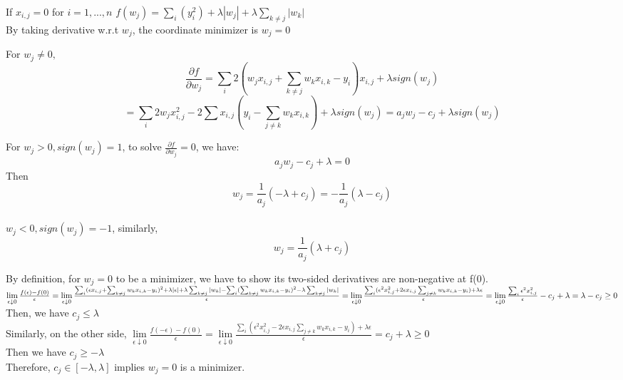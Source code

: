 \documentclass{article}
\newenvironment{problem}[2][$\bullet$]{\begin{trivlist}\large
		\item[\hskip \labelsep {\bfseries #1}\hskip \labelsep {\bfseries #2.}]}  {\end{trivlist}}
\newenvironment{sub}[2][$-$]{\begin{trivlist}
		\item[\hskip \labelsep {\bfseries #1}\hskip \labelsep {\bfseries #2.}]}  {\end{trivlist}}
\begin{document}
\begin{problem}{2.2 Derive the Coordinate Minimizer for Lasso}
\end{problem}

\begin{sub}{2.1.1}
\end{sub}
If $x_{i,j} = 0$ for $i = 1,...,n$  $f(w_j) = \sum_i (y_i^2) +\lambda |w_j| + \lambda \sum_{k \neq j} |w_k| $\\
By taking derivative w.r.t $w_j$, the coordinate minimizer is $w_j = 0$


\begin{sub}{2.2.2}
\end{sub}
For $w_j \neq 0, $\\$$ \frac{\partial f}{\partial w_j} = \sum_i 2(w_j x_{i,j} + \sum_{k \neq j} w_k x_{i,k} -y_i )x_{i,j} + \lambda sign(w_j)$$
 $$= \sum_i 2w_j x^2_{i,j} - 2\sum x_{i,j} (y_i - \sum_{j\neq k} w_k x_{i,k}) + \lambda sign(w_j) = a_j w_j - c_j +\lambda sign(w_j)$$
 
 \begin{sub}{2.1.3}
 \end{sub}
For $w_j > 0, sign(w_j) = 1$, to solve $ \frac{\partial f}{\partial w_j} = 0$, we have: \\
$$ a_j w_j - c_j +\lambda = 0$$Then
$$w_j = \frac{1}{a_j}(-\lambda +c_j) = -\frac{1}{a_j}(\lambda - c_j)$$\\
$w_j < 0, sign(w_j) = -1$, similarly, $$ w_j = \frac{1}{a_j}(\lambda +c_j) $$ 

\begin{sub}{2.1.4}
\end{sub}
By definition, for $w_j = 0$ to be a minimizer, we have to show its  two-sided derivatives are non-negative at f(0).\\
$\lim\limits_{\epsilon \downarrow 0}\frac{f(\epsilon) -f(0)}{\epsilon} =\lim\limits_{\epsilon \downarrow 0} \frac{\sum_i (\epsilon x_{i,j} + \sum_{k \neq j} w_k x_{i,k} -y_i )^2 + \lambda |\epsilon| + \lambda \sum_{k\neq j} |w_k| - \sum_i ( \sum_{k \neq j} w_k x_{i,k} -y_i )^2 - \lambda \sum_{k\neq j} |w_k| }{\epsilon} \\ = \lim\limits_{\epsilon \downarrow 0}\frac{\sum_i (\epsilon^2 x^2_{i,j} +2\epsilon x_{i,j}\sum_{j\neq k } w_kx_{i,k} - y_i )+ \lambda \epsilon}{\epsilon}  = \lim\limits_{\epsilon \downarrow 0} \frac{\sum_i \epsilon^2 x^2_{i,j}}{\epsilon}  -c_j + \lambda = \lambda -c_j \geq 0 $\\
Then, we have $c_j \leq \lambda$  \\
Similarly, on the other side, $\lim\limits_{\epsilon \downarrow 0}\frac{f( - \epsilon) -f(0)}{\epsilon} =\lim\limits_{\epsilon \downarrow 0}\frac{\sum_i (\epsilon^2 x^2_{i,j} -2\epsilon x_{i,j}\sum_{j\neq k } w_kx_{i,k} - y_i )+ \lambda \epsilon}{\epsilon}= c_j + \lambda \geq 0 $\\
Then we have $c_j \geq - \lambda$\\
Therefore, $c_j  \in [-\lambda, \lambda]$ implies $w_j = 0$ is a minimizer. 
\end{document}
